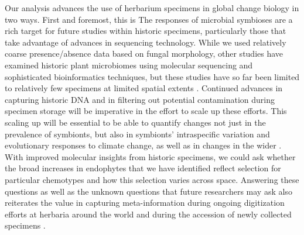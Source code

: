 \documentclass[11pt]{article}
\let\cite\citep
\newcommand{\revise}[1]{{\color{black}{#1}}}
\begin{document}
\revise{\subsubsection*{Herbaria for global change research}}
Our analysis advances the use of herbarium specimens in global change biology in two ways. 
First and foremost, this is \revise{one of a growing number of studies to examine microbial symbiosis using specimens from natural history collections, and the first, to our knowledge, to link long-term changes in the symbioses to changes in climate.}
The responses of microbial symbioses are a rich target for future studies within historic specimens, particularly those that take advantage of advances in sequencing technology.
While we used relatively coarse presence/absence data based on fungal morphology, other studies have examined historic plant microbiomes using molecular sequencing and sophisticated bioinformatics techniques, but these studies have so far been limited to relatively few specimens at limited spatial extents \cite{yoshida2015computational,heberling2019utilizing, bieker2020metagenomic,gross2021hidden,bradshaw2021global}. 
Continued advances in capturing historic DNA and in filtering out potential contamination during specimen storage \citep{daru2019novel,bakker2020herbarium,raxworthy2021mining} will be imperative in the effort to scale up these efforts. 
This scaling up will be essential to be able to quantify changes not just in the prevalence of symbionts, but also in symbionts' intraspecific variation and evolutionary responses to climate change, as well as in changes in the wider \revise{host microbiome}. 
With improved molecular insights from historic specimens, we could ask whether the broad increases in endophytes that we have identified reflect selection for particular \revise{genetic strains or} chemotypes and how this selection varies across space.
Answering these questions as well as the unknown questions that future researchers may ask also reiterates the value in capturing meta-information during ongoing digitization efforts at herbaria around the world and during the accession of newly collected specimens \citep{lendemer2020extended,edwards2024university}.
\end{document}
